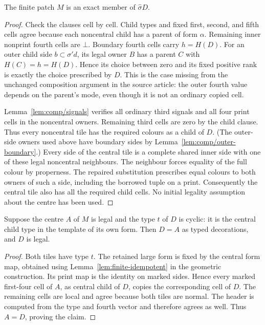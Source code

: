 \begin{lemma}
\label{lem:comp/exact}
The finite patch $M$ is an exact member of $\widehat\sigma D$.
\end{lemma}
\begin{proof}
Check the clauses cell by cell. Child types and fixed first, second, and
fifth cells agree because each noncentral child has a parent of form $\alpha$.
Remaining inner nonprint fourth cells are $\bot$. Boundary fourth cells carry
$h=H(D)$. For an outer child side $b\subset\sigma'd$, its legal owner $B$
has a parent $C$ with $H(C)=h=H(D)$. Hence its choice between zero and its
fixed positive rank is exactly the choice prescribed by $D$. This is the
case missing from the unchanged composition argument in the source article:
the outer fourth value depends on the parent's mode, even though it is
not an ordinary copied cell.

Lemma~\ref{lem:comp/signals} verifies all ordinary third signals and all
four print cells in the noncentral owners. Remaining third cells are zero
by the child clause. Thus every noncentral tile has the required colours
as a child of $D$. (The outer-side owners used above have boundary sides
by Lemma~\ref{lem:comp/outer-boundary}.) Every side of the central tile is
a complete shared inner side with one of these legal noncentral neighbours. The neighbour forces
equality of the full colour by properness. The repaired substitution
prescribes equal colours to both owners of such a side, including the
borrowed tuple on a print. Consequently the central tile also has all the
required child cells. No initial legality assumption about the centre
has been used.
\end{proof}

\begin{lemma}
\label{lem:comp/cyclic-legal}
Suppose the centre $A$ of $M$ is legal and the type $t$ of $D$ is cyclic:
it is the central child type in the template of its own form. Then $D=A$
as typed decorations, and $D$ is legal.
\end{lemma}
\begin{proof}
Both tiles have type $t$. The retained large form is fixed by the central
form map, obtained using Lemma~\ref{lem:finite-idempotent} in the geometric
construction. Its print map is the identity on marked sides. Hence every
marked first-four cell of $A$, as central child of $D$, copies the
corresponding cell of $D$. The remaining cells are local and agree because
both tiles are normal. The header is computed from the type and fourth
vector and therefore agrees as well. Thus $A=D$, proving the claim.
\end{proof}

